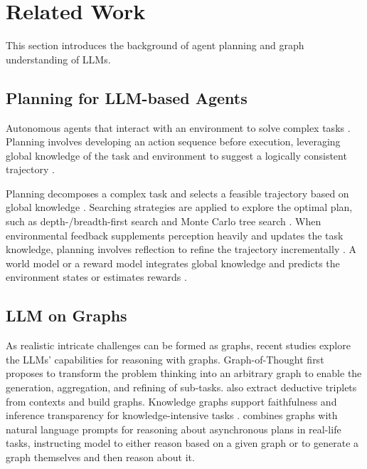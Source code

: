 \section{Related Work}
This section introduces the background of agent planning and graph understanding of LLMs.

\subsection{Planning for LLM-based Agents}
Autonomous agents that interact with an environment to solve complex tasks \cite{yao2022webshop,fan2022minedojo}. Planning involves developing an action sequence before execution, leveraging global knowledge of the task and environment to suggest a logically consistent trajectory \cite{huang2024understanding}. 

Planning decomposes a complex task and selects a feasible trajectory based on global knowledge \cite{valmeekam2023on, wang2023plan, wu2024oscopilot}.
Searching strategies are applied to explore the optimal plan, such as depth-/breadth-first search and Monte Carlo tree search \cite{yao2023tree, zhou2024language,qi2024mutual, zhao2024large}.
When environmental feedback supplements perception heavily and updates the task knowledge, planning involves reflection to refine the trajectory incrementally \cite{shinn2024reflexion}.
A world model or a reward model integrates global knowledge and predicts the environment states or estimates rewards \cite{hao-etal-2023-reasoning, qiao2024agent}.

\subsection{LLM on Graphs}
As realistic intricate challenges can be formed as graphs, recent studies explore the LLMs' capabilities for reasoning with graphs.
Graph-of-Thought \cite{besta2024got, Ning2024DGoTDG} first proposes to transform the problem thinking into an arbitrary graph to enable the generation, aggregation, and refining of sub-tasks.
\citet{yao-etal-2024-got} also extract deductive triplets from contexts and build graphs.
Knowledge graphs support faithfulness and inference transparency for knowledge-intensive tasks \cite{Luo2023ReasoningOG, sun2024thinkongraph, Wen2023MindMapKG}. \citet{lin2024graphenhanced} combines graphs with natural language prompts for reasoning about asynchronous plans in real-life tasks, instructing model to either reason based on a given graph or to generate a graph themselves and then reason about it.


